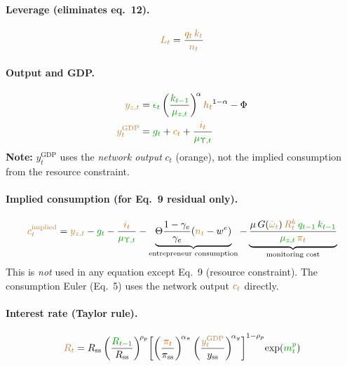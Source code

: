 \documentclass[11pt]{article}
\begin{document}
\paragraph{Leverage (eliminates eq.~12).}
\begin{equation*}
  \textcolor{brown}{L_t} = \frac{\textcolor{orange!80!black}{q_t}\,\textcolor{brown}{k_t}}
    {\textcolor{brown}{n_t}}
\end{equation*}

\paragraph{Output and GDP.}
\begin{align*}
  \textcolor{brown}{y_{z,t}}
    &= \textcolor{green!60!black}{\epsilon_t}
       \left(\frac{\textcolor{green!60!black}{k_{t-1}}}{\textcolor{green!60!black}{\mu_{z,t}}}\right)^{\!\alpha}
       \textcolor{orange!80!black}{h_t}^{1-\alpha} - \Phi
  \\
  \textcolor{brown}{y_t^{\text{GDP}}}
    &= \textcolor{green!60!black}{g_t} + \textcolor{orange!80!black}{c_t}
       + \frac{\textcolor{orange!80!black}{i_t}}{\textcolor{green!60!black}{\mu_{\Upsilon,t}}}
\end{align*}
\textbf{Note:} $y_t^{\text{GDP}}$ uses the \emph{network output} $c_t$
(orange), not the implied consumption from the resource constraint.

\paragraph{Implied consumption (for Eq.~9 residual only).}
\begin{equation*}
  \textcolor{brown}{c_t^{\text{implied}}} = \textcolor{brown}{y_{z,t}} - \textcolor{green!60!black}{g_t}
    - \frac{\textcolor{orange!80!black}{i_t}}{\textcolor{green!60!black}{\mu_{\Upsilon,t}}}
    - \underbrace{\Theta\frac{1-\gamma_e}{\gamma_e}(\textcolor{brown}{n_t} - w^e)}_{\text{entrepreneur consumption}}
    - \underbrace{\frac{\mu\,G(\textcolor{brown}{\bar\omega_t})\,\textcolor{brown}{R_t^k}\,
      \textcolor{green!60!black}{q_{t-1}}\,\textcolor{green!60!black}{k_{t-1}}}
      {\textcolor{green!60!black}{\mu_{z,t}}\,\textcolor{orange!80!black}{\pi_t}}}_{\text{monitoring cost}}
\end{equation*}
This is \emph{not} used in any equation except Eq.~9 (resource constraint).
The consumption Euler (Eq.~5) uses the network output $\textcolor{orange!80!black}{c_t}$ directly.

\paragraph{Interest rate (Taylor rule).}
\begin{equation*}
  \textcolor{brown}{R_t}
    = R_{\text{ss}} \left(\frac{\textcolor{green!60!black}{R_{t-1}}}{R_{\text{ss}}}\right)^{\!\rho_p}
      \!\left[
        \left(\frac{\textcolor{orange!80!black}{\pi_t}}{\pi_{\text{ss}}}\right)^{\!\alpha_\pi}
        \left(\frac{\textcolor{brown}{y_t^{\text{GDP}}}}{y_{\text{ss}}}\right)^{\!\alpha_y}
      \right]^{1-\rho_p}
      \!\exp(\textcolor{green!60!black}{m_t^p})
\end{equation*}
\end{document}
